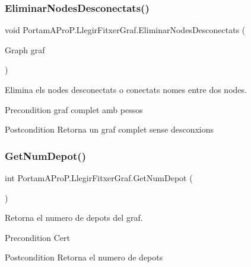 \subsubsection{\texorpdfstring{Eliminar\+Nodes\+Desconectats()}{EliminarNodesDesconectats()}}
{\footnotesize\ttfamily void Portam\+A\+Pro\+P.\+Llegir\+Fitxer\+Graf.\+Eliminar\+Nodes\+Desconectats (\begin{DoxyParamCaption}\item[{Graph}]{graf }\end{DoxyParamCaption})}



Elimina els nodes desconectats o conectats nomes entre dos nodes. 

\begin{DoxyPrecond}{Precondition}
graf complet amb pessos 
\end{DoxyPrecond}
\begin{DoxyPostcond}{Postcondition}
Retorna un graf complet sense desconxions 
\end{DoxyPostcond}
\mbox{\label{class_portam_a_pro_p_1_1_llegir_fitxer_graf_a45dd3b57e65010e9e6eaf940d7695527}} 
\subsubsection{\texorpdfstring{Get\+Num\+Depot()}{GetNumDepot()}}
{\footnotesize\ttfamily int Portam\+A\+Pro\+P.\+Llegir\+Fitxer\+Graf.\+Get\+Num\+Depot (\begin{DoxyParamCaption}{ }\end{DoxyParamCaption})}



Retorna el numero de depots del graf. 

\begin{DoxyPrecond}{Precondition}
Cert 
\end{DoxyPrecond}
\begin{DoxyPostcond}{Postcondition}
Retorna el numero de depots 
\end{DoxyPostcond}
\mbox{\label{class_portam_a_pro_p_1_1_llegir_fitxer_graf_afdbe4a4f48460910592efa5589776d62}} 
